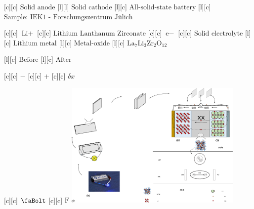 \begin{Figure}[h]
    \centering
    \footnotesize
		
		 {$\text{Solid anode}$}
    [l][l] {$\text{Solid cathode}$}
		 {$\text{All-solid-state battery}$}
		 {$\text{Sample: IEK1 - Forschungszentrum Jülich}$}
		
		 {$\text{Li}+$}
		 {$\text{Lithium Lanthanum Zirconate}$}
		 {$\text{e}-$}
		 {$\text{Solid electrolyte}$}
		 {$\text{Lithium metal}$}
		 {$\text{Metal-oxide}$}
		 {$\text{La}_{7}\text{Li}_{3}\text{Zr}_{2}\text{O}_{12}$}
		
		 {$\text{Before}$}
		 {$\text{After}$}
		
		 {$-$}
		 {$+$}
		 {$\delta x$}
		
		 {$\text{\faBolt}$}
		 {$\text{F}$}
    \includegraphics[width=0.65\textwidth]{dendrite.eps}
		
\end{Figure}


